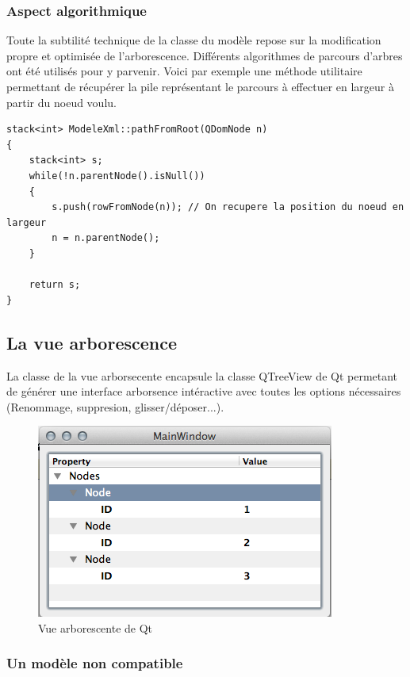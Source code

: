 \subsubsection{Aspect algorithmique}
Toute la subtilité technique de la classe du modèle repose sur la modification propre et optimisée de l'arborescence.
Différents algorithmes de parcours d'arbres ont été utilisés pour y parvenir. Voici par exemple une méthode utilitaire permettant de récupérer la pile représentant le parcours à effectuer en largeur à partir du noeud voulu.

\begin{lstlisting}
stack<int> ModeleXml::pathFromRoot(QDomNode n)
{
    stack<int> s;
    while(!n.parentNode().isNull())
    {
        s.push(rowFromNode(n)); // On recupere la position du noeud en largeur
        n = n.parentNode();
    }

    return s;
}
\end{lstlisting}

\subsection{La vue arborescence}

La classe de la vue arborsecente encapsule la classe QTreeView de Qt permetant de générer une interface arborsence
intéractive avec toutes les options nécessaires (Renommage, suppresion, glisser/déposer...).

\begin{figure}[h!]
\begin{minipage}[b]{\linewidth}
\centering \includegraphics[scale=0.5]{images/arbo.png}
\caption{Vue arborescente de Qt}
\label{arbo}
\end{minipage}
\end{figure}

\subsubsection{Un modèle non compatible}


